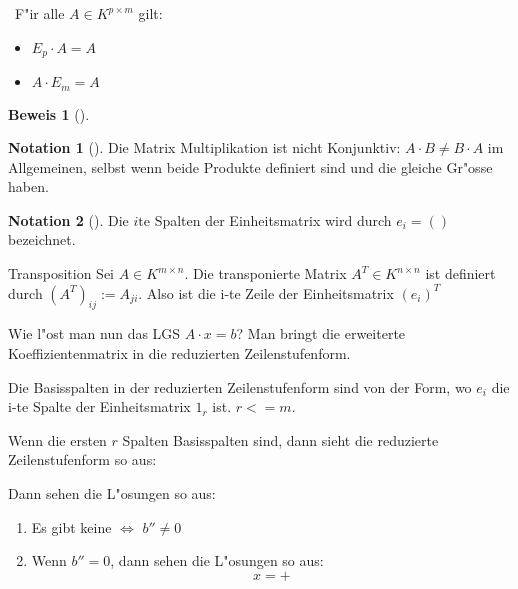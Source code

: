 \documentclass[oneside,fontsize=11pt,paper=a4,BCOR=0mm,DIV=12,automark,headsepline]{scrbook}
\theoremstyle{remark}
\theoremstyle{definition}
\newtheorem*{notation}{Notation}
\theoremstyle{definition}
\newtheorem*{prof}{Beweis}
\theoremstyle{remark}
\begin{document}
\begin{theo}{}{} \
F"ir alle \(A\in K^{p\times m}\) gilt:
\begin{itemize}
\item \(E_p\cdot A=A\)
\item \(A\cdot E_m =A\)
\end{itemize}
\end{theo}

\begin{prof}[]

\end{prof}


\begin{notation}[]
Die Matrix Multiplikation ist nicht Konjunktiv: \(A\cdot B\not= B\cdot A\) im
Allgemeinen, selbst wenn beide Produkte definiert sind und die gleiche Gr"osse
haben.
\end{notation}

\begin{exa}

\end{exa}

\begin{notation}[]
Die \(i\text{te}\) Spalten der Einheitsmatrix wird durch \(e_i=()\) bezeichnet.
\end{notation}

\begin{definition}{Transposition}{}
Sei \(A\in K^{m\times n}\). Die transponierte Matrix \(A^{T}\in K^{n\times n}\) ist
definiert durch \((A^T)_{ij}:=A_{ji}\). Also ist die i-te Zeile der Einheitsmatrix \((e_i)^T\)
\end{definition}

Wie l"ost man nun das LGS \(A\cdot x=b\)? Man bringt die erweiterte
Koeffizientenmatrix in die reduzierten Zeilenstufenform.

\begin{relation}
Die Basisspalten in der reduzierten Zeilenstufenform sind von der Form, wo \(e_i\)
die i-te Spalte der Einheitsmatrix \(1_r\) ist. \(r <= m\).
\end{relation}

Wenn die ersten \(r\) Spalten Basisspalten sind, dann sieht die reduzierte
Zeilenstufenform so aus:


Dann sehen die L"osungen so aus:
\begin{relation}
\begin{enumerate}
\item Es gibt keine \(\iff\) \(b''\not= 0\)
\item Wenn \(b''=0\), dann sehen die L"osungen so aus: \[x=+\]
\end{enumerate}
\end{relation}
\end{document}
